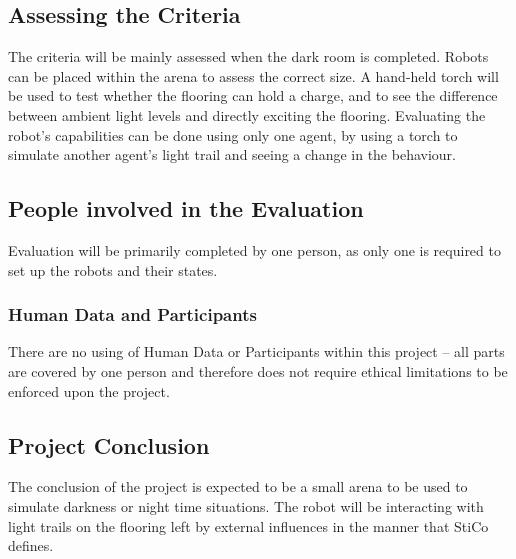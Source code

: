 \subsection{Assessing the Criteria} \label{desEvalAss}
The criteria will be mainly assessed when the dark room is completed.  Robots
can be placed within the arena to assess the correct size.  A hand-held torch
will be used to test whether the flooring can hold a charge, and to see the
difference between ambient light levels and directly exciting the flooring.
Evaluating the robot's capabilities can be done using only one agent, by using
a torch to simulate another agent's light trail and seeing a change in the
behaviour.

\subsection{People involved in the Evaluation} \label{desEvalPeople}
Evaluation will be primarily completed by one person, as only one is required to
set up the robots and their states.

\subsubsection{Human Data and Participants} \label{desEvalHDP}
There are no using of Human Data or Participants within this project -- all
parts are covered by one person and therefore does not require ethical 
limitations to be enforced upon the project.

\subsection{Project Conclusion} \label{desEvalCon}
The conclusion of the project is expected to be a small arena to be used to
simulate darkness or night time situations.  The robot will be interacting with
light trails on the flooring left by external influences in the manner that
StiCo defines.
